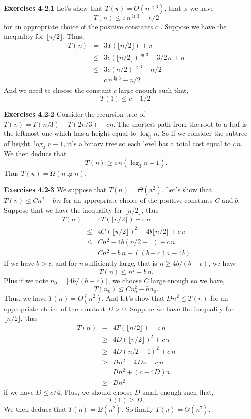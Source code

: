\documentclass[a4paper,12pt]{article}
\newcommand{\newpar}[1]
{\bigskip \noindent \textbf{Exercises #1} \newline}
\begin{document}
\newpar{4-2.1}
Let's show that $T(n) = O(n^{\lg 3})$, that is we have
\[ T(n) \le c\,n^{\lg 3} - n/2\]
for an appropriate choice of the positive constants $c$ .
Suppose we have the inequality for $\lfloor n/2\rfloor$.  Thus,
\begin{eqnarray*}
T(n) &=& 3T(\lfloor n/2\rfloor) + n \\
&\le& 3c(\lfloor n/2\rfloor)^{\lg 3} - 3/2\,n+ n \\
&\le& 3c(n/2)^{\lg 3} - n/2  \\
&=& c\,n^{\lg 3} - n/2
\end{eqnarray*}
And we need to choose the constant $c$ large enough such that,
\[ T(1) \le c - 1/2.\]

\newpar{4.2-2}
Consider the recursion tree of $T(n) = T(n/3) + T(2n/3) + cn$.  The
shortest path from the root to a leaf is the leftmost one which has a
height equal to $\log_3 n$.  So if we consider the subtree of height
$\log_3 n-1$, it's a binary tree so each level has a total cost equal
to $c\,n$.  We then deduce that,
\[ T(n) \ge c\,n (\log_3 n - 1).\]
Thus $T(n) = \Omega(n\lg n)$.

\newpar{4.2-3} We suppose that $T(n) = \Theta(n^2).$ Let's show that
$T(n) \le Cn^2 - b\,n$ for an appropriate choice of the positive
constants $C$ and $b$.  Suppose that we have the inequality for $\lfloor
n/2\rfloor$, thus
\begin{eqnarray*}
T(n) &=& 4 T(\lfloor n/2\rfloor) + c\,n \\
&\le& 4C(\lfloor n/2\rfloor)^2 - 4b\lfloor n/2\rfloor + c\,n \\
&\le& C n^2 - 4b(n/2 - 1) + c\,n \\
&=& C n^2 - b\,n - ((b-c)n - 4b)
\end{eqnarray*}
If we have $b > c$, and for $n$ sufficiently large, that is $n \ge
4b/(b-c)$, we have
\[ T(n) \le n^2 - b\,n.\]
Plus if we note $n_0 = \lfloor 4b/(b-c)\rfloor$, we choose $C$ large
enough so we have,
\[ T(n_0) \le Cn_0^2 - b\,n_0.\]
Thus, we have $T(n) = O(n^2)$.  And let's show that $Dn^2 \le T(n)$
for an appropriate choice of the constant $D > 0$.  Suppose we have
the inequality for $\lfloor n/2\rfloor$, thus
\begin{eqnarray*}
T(n) &=& 4 T(\lfloor n/2\rfloor) + c\,n \\
&\ge& 4 D(\lfloor n/2\rfloor)^2 + c\,n \\
&\ge& 4 D(n/2 - 1)^2 + c\,n \\
&\ge& Dn^2 - 4Dn + c\,n \\
&=& Dn^2 + (c - 4D) n \\
&\ge& Dn^2
\end{eqnarray*}
if we have $D \le c/4$.  Plus, we should choose $D$ small enough such
that,
\[ T(1) \ge D.\]
We then deduce that $T(n) = \Omega(n^2)$.  So finally $T(n) =
\Theta(n^2)$.
\end{document}
